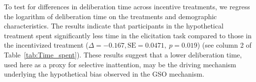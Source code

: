 \documentclass[12pt]{article}
\begin{document}
To test for differences in deliberation time across incentive treatments, we regress the logarithm of deliberation time on the  treatments and demographic characteristics. The results indicate that participants in the hypothetical treatment spent significantly less time in the elicitation task compared to those in the incentivized treatment  (\(\Delta = -0.167, \text{SE} = 0.0471,\ p = 0.019\)) (see column 2 of Table~\ref{tab:Time_spent}). 
These results suggest that a lower deliberation time, used here as a proxy for selective inattention, may be the driving mechanism underlying the hypothetical bias observed in the GSO mechanism.
\end{document}
